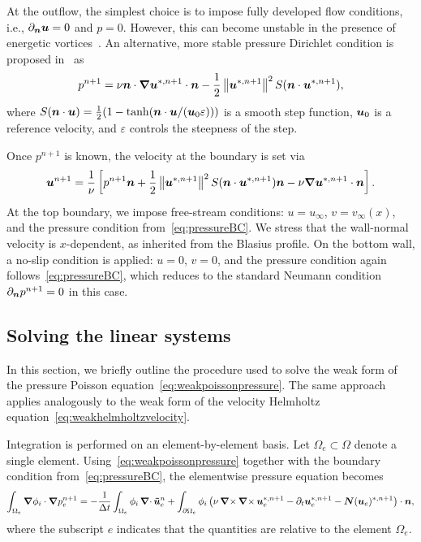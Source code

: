\documentclass[../main.tex]{subfiles}
\begin{document}
At the outflow, the simplest choice is to impose fully developed flow conditions, i.e., $\partial_{\bm{n}} \bm{u} = 0$ and $p = 0$. However, this can become unstable in the presence of energetic vortices~\cite{nektaruserguide,outflowBoundaryCondition}. An alternative, more stable pressure Dirichlet condition is proposed in~\cite{outflowBoundaryCondition} as
\begin{equation}
	p^{n+1} = \nu \bm{n} \cdot \bm{\nabla} \bm{u}^{*,n+1} \cdot \bm{n} - \frac{1}{2} \left\|\bm{u}^{*,n+1}\right\|^2 S(\bm{n}\cdot \bm{u}^{*,n+1}),
	\label{eq:outflowBC}
\end{equation}
where $S(\bm{n} \cdot \bm{u}) = \frac{1}{2}(1 - \tanh(\bm{n} \cdot \bm{u} / (\bm{u}_0 \varepsilon)))$ is a smooth step function, $\bm{u}_0$ is a reference velocity, and $\varepsilon$ controls the steepness of the step.

Once $p^{n+1}$ is known, the velocity at the boundary is set via
\begin{equation}
	\bm{u}^{n+1} = \frac{1}{\nu} \left[ p^{n+1} \bm{n} + \frac{1}{2} \left\|\bm{u}^{*,n+1}\right\|^2 S(\bm{n} \cdot \bm{u}^{*,n+1}) \bm{n} - \nu \grad \bm{u}^{*,n+1} \cdot \bm{n} \right].
	\label{eq:outflowBCu}
\end{equation}
At the top boundary, we impose free-stream conditions: $u = u_\infty$, $v = v_\infty(x)$, and the pressure condition from~\eqref{eq:pressureBC}. We stress that the wall-normal velocity is $x$-dependent, as inherited from the Blasius profile. On the bottom wall, a no-slip condition is applied: $u = 0$, $v = 0$, and the pressure condition again follows~\eqref{eq:pressureBC}, which reduces to the standard Neumann condition $\partial_{\bm{n}} p^{n+1} = 0$ in this case.

\subsection{Solving the linear systems}\label{sec:solving}

In this section, we briefly outline the procedure used to solve the weak form of the pressure Poisson equation~\eqref{eq:weakpoissonpressure}. The same approach applies analogously to the weak form of the velocity Helmholtz equation~\eqref{eq:weakhelmholtzvelocity}.

Integration is performed on an element-by-element basis. Let $\Omega_e \subset \Omega$ denote a single element. Using~\eqref{eq:weakpoissonpressure} together with the boundary condition from~\eqref{eq:pressureBC}, the elementwise pressure equation becomes
\begin{equation}
	\int_{\Omega_e} \grad \phi_{i} \cdot \grad p_e^{n+1} = -\frac{1}{\Delta t} \int_{\Omega_e} \phi_{i} \operatorname{\bm{\nabla}\cdot} \bm{\tilde{u}}_e^n + \int_{\partial\Omega_e} \phi_{i} \left( \nu \operatorname{\bm{\nabla}\times} \operatorname{\bm{\nabla}\times} \bm{u}_e^{*,n+1} - \partial_t \bm{u}_e^{*,n+1} - \bm{N}(\bm{u}_e)^{*,n+1} \right) \cdot \bm{n},
	\label{eq:weakpoissonpressureelement}
\end{equation}
where the subscript $e$ indicates that the quantities are relative to the element $\Omega_e$. 
\end{document}
